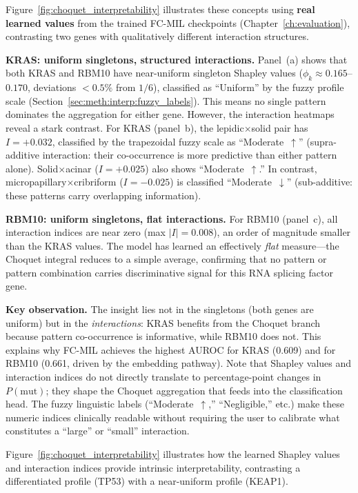 Figure~\ref{fig:choquet_interpretability} illustrates these concepts
using \textbf{real learned values} from the trained FC-MIL checkpoints
(Chapter~\ref{ch:evaluation}), contrasting two genes with
qualitatively different interaction structures.

\textbf{KRAS: uniform singletons, structured interactions.}
Panel~(a) shows that both KRAS and RBM10 have near-uniform singleton
Shapley values ($\phi_k \approx 0.165$--$0.170$, deviations $< 0.5\%$
from $1/6$), classified as ``Uniform'' by the fuzzy profile scale
(Section~\ref{sec:meth:interp:fuzzy_labels}).
This means no single pattern dominates the aggregation for either
gene.
However, the interaction heatmaps reveal a stark contrast.
For KRAS (panel~b), the lepidic$\times$solid pair has
$I = +0.032$, classified by the trapezoidal fuzzy scale as
``Moderate~$\uparrow$'' (supra-additive interaction: their
co-occurrence is more predictive than either pattern alone).
Solid$\times$acinar ($I = +0.025$) also shows ``Moderate~$\uparrow$.''
In contrast, micropapillary$\times$cribriform ($I = -0.025$)
is classified ``Moderate~$\downarrow$'' (sub-additive: these
patterns carry overlapping information).

\textbf{RBM10: uniform singletons, flat interactions.}
For RBM10 (panel~c), all interaction indices are near zero
(max $|I| = 0.008$), an order of magnitude smaller than the KRAS
values.
The model has learned an effectively \emph{flat} measure---the
Choquet integral reduces to a simple average, confirming that
no pattern or pattern combination carries discriminative signal for
this RNA splicing factor gene.

\textbf{Key observation.}
The insight lies not in the singletons (both genes are uniform)
but in the \emph{interactions}: KRAS benefits from the Choquet
branch because pattern co-occurrence is informative, while RBM10
does not.
This explains why FC-MIL achieves the highest AUROC for KRAS
(0.609) and for RBM10 (0.661, driven by the embedding pathway).
Note that Shapley values and interaction indices do not directly
translate to percentage-point changes in $P(\text{mut})$; they
shape the Choquet aggregation that feeds into the classification
head.
The fuzzy linguistic labels (``Moderate~$\uparrow$,''
``Negligible,'' etc.) make these numeric indices clinically
readable without requiring the user to calibrate what constitutes
a ``large'' or ``small'' interaction.

Figure~\ref{fig:choquet_interpretability} illustrates how the learned
Shapley values and interaction indices provide intrinsic
interpretability, contrasting a differentiated profile (TP53) with
a near-uniform profile (KEAP1).

